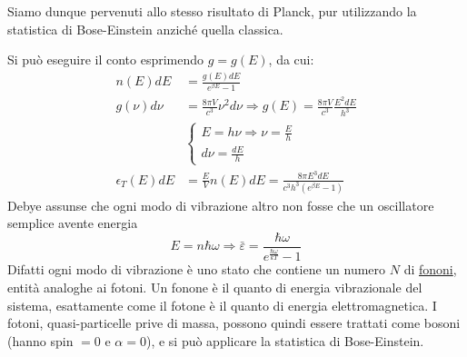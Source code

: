Siamo dunque pervenuti allo stesso risultato di Planck, pur utilizzando la statistica di Bose-Einstein anziché quella classica.

Si può eseguire il conto esprimendo $g=g(E)$, da cui:
\begin{equation}
\begin{split}
n(E)dE & = \frac{ g(E) dE}{e^{ \beta E } - 1 } \\
g(\nu) d\nu & = \frac{ 8 \pi V}{c^3 } \nu^2 d\nu \Rightarrow g(E) = \frac{ 8 \pi V}{c^3 } \frac{ E^2 dE}{h^3 } \\
& \begin{cases}
	E = h\nu \Rightarrow \nu = \frac{ E}{h } \\
	d\nu = \frac{ dE}{h }
\end{cases} \\
\epsilon_T(E)dE & = \frac{ E}{V } n(E) dE = \frac{ 8\pi E^3 dE}{c^3 h^3 (e^{ \beta E } - 1) }
\end{split}
\end{equation}
Debye assunse che ogni modo di vibrazione altro non fosse che un oscillatore semplice avente energia
$$E=n \hbar \omega \Rightarrow \bar \varepsilon = \frac{ \hbar \omega}{e^{ \frac{ \hbar \omega}{ kT} } - 1 }$$
Difatti ogni modo di vibrazione è uno stato che contiene un numero $N$ di \underline{fononi}, entità analoghe ai fotoni.
Un fonone è il quanto di energia vibrazionale del sistema, esattamente come il fotone è il quanto di energia elettromagnetica.
I fotoni, quasi-particelle prive di massa, possono quindi essere trattati come bosoni (hanno spin $= 0$ e $\alpha = 0$), e si può applicare la statistica di Bose-Einstein.










